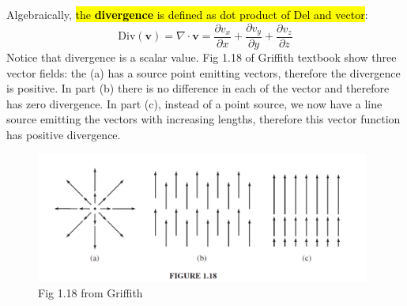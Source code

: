\documentclass[12pt,a4paper,twoside]{article}
\begin{document}
	\noindent Algebraically, \hl{the \textbf{divergence} is defined as dot product of Del and vector}:
	\begin{equation}
		\mathrm{Div(\textbf{v})}=\nabla\cdot\textbf{v} = \frac{\partial v_x}{\partial x}+\frac{\partial v_y}{\partial y}+\frac{\partial v_z}{\partial z}
	\end{equation}
	Notice that divergence is a scalar value. Fig 1.18 of Griffith textbook show three vector fields: the (a) has a source point emitting vectors,  therefore the divergence is positive. In part (b) there is no difference in each of the vector and therefore has zero divergence. In part (c), instead of a point source, we now have a line source emitting the vectors with increasing lengths, therefore this vector function has positive divergence.
	\begin{figure}[h]
		\centering
		\includegraphics[width=11cm]{divergence.png}
		\caption{Fig 1.18 from Griffith}
		\label{fig:1.18}
	\end{figure}
	
\end{document}
